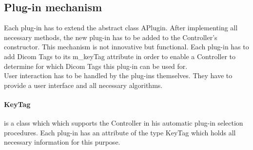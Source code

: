 \subsection{Plug-in mechanism}
Each plug-in has to extend the abstract class APlugin. After implementing all necessary methods, the new plug-in has to be added to the Controller's constructor. This mechanism is not innovative but functional. Each plug-in has to add Dicom Tags to its m\_keyTag attribute in order to enable a Controller to determine for which Dicom Tags this plug-in can be used for.\\
User interaction has to be handled by the plug-ins themselves. They have to provide a user interface and all necessary algorithms. 
\paragraph{KeyTag} is a class which which supports the Controller in his automatic plug-in selection procedures. Each plug-in has an attribute of the type KeyTag which holds all necessary information for this purpose.


%
%